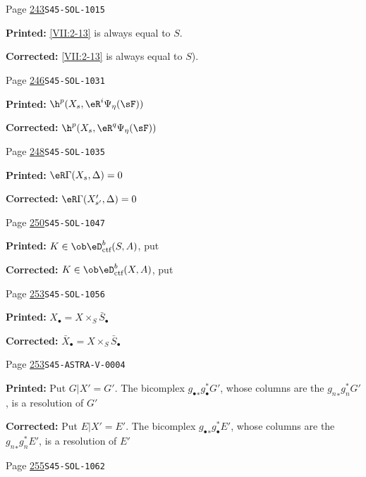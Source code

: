 \begin{description}
\smallskip
\item[\hypertarget{apparatus:EN-0175}{175}] Page \hyperlink{printpage:en:243}{243}\quad\texttt{S45-SOL-1015}
\par\noindent\textbf{Printed:} \ref{VII:2-13} is always equal to $S$.
\par\noindent\textbf{Corrected:} \ref{VII:2-13} is always equal to $S$).
\smallskip
\item[\hypertarget{apparatus:EN-0176}{176}] Page \hyperlink{printpage:en:246}{246}\quad\texttt{S45-SOL-1031}
\par\noindent\textbf{Printed:} \(\h^p(X_s,\eR^i\Psi_\eta(\sF))\)
\par\noindent\textbf{Corrected:} \(\h^p(X_s,\eR^q\Psi_\eta(\sF))\)
\smallskip
\item[\hypertarget{apparatus:EN-0177}{177}] Page \hyperlink{printpage:en:248}{248}\quad\texttt{S45-SOL-1035}
\par\noindent\textbf{Printed:} $\eR\Gamma(X_s,\Delta)=0$
\par\noindent\textbf{Corrected:} $\eR\Gamma(X_{s'}',\Delta)=0$
\smallskip
\item[\hypertarget{apparatus:EN-0178}{178}] Page \hyperlink{printpage:en:250}{250}\quad\texttt{S45-SOL-1047}
\par\noindent\textbf{Printed:} $K\in\ob\eD_\text{ctf}^b(S,A)$, put
\par\noindent\textbf{Corrected:} $K\in\ob\eD_\text{ctf}^b(X,A)$, put
\smallskip
\item[\hypertarget{apparatus:EN-0179}{179}] Page \hyperlink{printpage:en:253}{253}\quad\texttt{S45-SOL-1056}
\par\noindent\textbf{Printed:} \(X_\bullet=X\times_S \bar S_\bullet\)
\par\noindent\textbf{Corrected:} \(\bar X_\bullet=X\times_S \bar S_\bullet\)
\smallskip
\item[\hypertarget{apparatus:EN-0180}{180}] Page \hyperlink{printpage:en:253}{253}\quad\texttt{S45-ASTRA-V-0004}
\par\noindent\textbf{Printed:} Put
$G|X'=G'$. The bicomplex ${g_\bullet}_\ast g_\bullet^\ast G'$, whose columns
are the ${g_n}_\ast g_n^\ast G'$, is a resolution of $G'$
\par\noindent\textbf{Corrected:} Put
$E|X'=E'$. The bicomplex ${g_\bullet}_\ast g_\bullet^\ast E'$, whose columns
are the ${g_n}_\ast g_n^\ast E'$, is a resolution of $E'$
\smallskip
\item[\hypertarget{apparatus:EN-0181}{181}] Page \hyperlink{printpage:en:255}{255}\quad\texttt{S45-SOL-1062}

\end{description}
